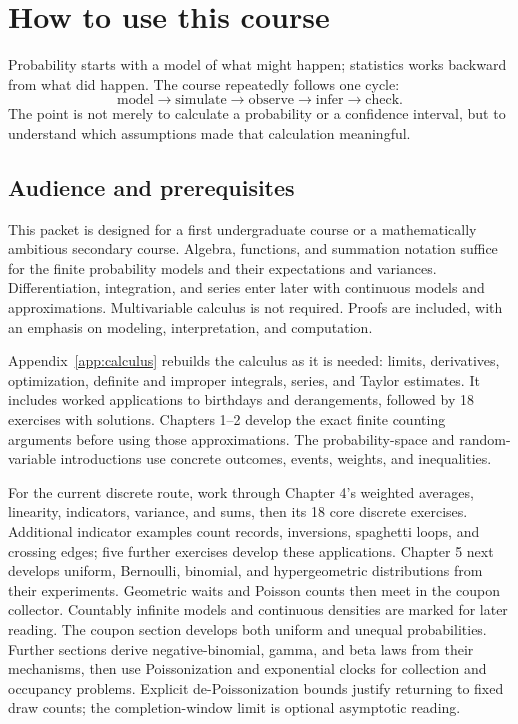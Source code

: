 \chapter*{How to use this course}

\begin{bigidea}
Probability starts with a model of what might happen; statistics works backward from what did happen. The course repeatedly follows one cycle:
\[
\text{model} \longrightarrow \text{simulate} \longrightarrow \text{observe} \longrightarrow \text{infer} \longrightarrow \text{check}.
\]
The point is not merely to calculate a probability or a confidence interval, but to understand which assumptions made that calculation meaningful.
\end{bigidea}

\section*{Audience and prerequisites}

This packet is designed for a first undergraduate course or a mathematically
ambitious secondary course. Algebra, functions, and summation notation
suffice for the finite probability models and their expectations and variances.
Differentiation, integration, and series enter later with continuous models
and approximations. Multivariable calculus is not required. Proofs are
included, with an emphasis on modeling, interpretation, and computation.

Appendix~\ref{app:calculus} rebuilds the calculus as it is needed: limits,
derivatives, optimization, definite and improper integrals, series, and
Taylor estimates. It includes worked applications to birthdays and
derangements, followed by 18 exercises with solutions. Chapters 1--2
develop the exact finite counting arguments before using those approximations.
The probability-space and random-variable introductions use concrete
outcomes, events, weights, and inequalities.

For the current discrete route, work through Chapter 4's weighted averages,
linearity, indicators, variance, and sums, then its 18 core discrete exercises.
Additional indicator examples count records, inversions, spaghetti loops,
and crossing edges; five further exercises develop these applications.
Chapter 5 next develops uniform, Bernoulli, binomial, and hypergeometric
distributions from their experiments. Geometric waits and Poisson counts
then meet in the coupon collector. Countably infinite models and
continuous densities are marked for later reading.
The coupon section develops both uniform and unequal probabilities.
Further sections derive negative-binomial, gamma, and beta laws from
their mechanisms, then use Poissonization and exponential clocks for
collection and occupancy problems. Explicit de-Poissonization bounds
justify returning to fixed draw counts; the completion-window limit is
optional asymptotic reading.

